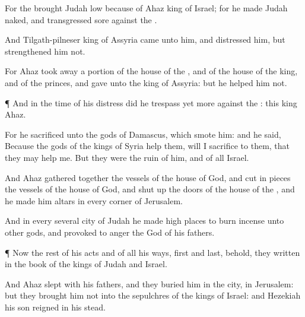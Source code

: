 {For the
{}
brought
Judah
low because of
Ahaz
king of
Israel; for he
made
Judah
naked, and
transgressed
sore against the
{}.

And
Tilgath-pilneser
king of
Assyria
came unto him, and
distressed him, but
strengthened him not.

For
Ahaz took away a
portion
{} of the
house of the
{}, and
{} of the
house of the
king, and of the
princes, and
gave
{} unto the
king of
Assyria: but he
helped him not.


\par }{\PP {}¶ And in the
time of his
distress did he
trespass yet
more against the
{}: this
{}
king
Ahaz.

For he
sacrificed unto the
gods of
Damascus, which
smote him: and he
said, Because the
gods of the
kings of
Syria
help them,
{} will I
sacrifice to them, that they may
help me. But they were the
ruin of him, and of all
Israel.

And
Ahaz gathered
together the
vessels of the
house of
God, and cut in
pieces the
vessels of the
house of
God, and shut
up the
doors of the
house of the
{}, and he
made him
altars in every
corner of
Jerusalem.

And in every several
city of
Judah he
made high
places to burn
incense unto
other
gods, and provoked to
anger the
{}
God of his
fathers.


\par }{\PP {}¶ Now the
rest of his
acts and of all his
ways,
first and
last, behold, they
{}
written in the
book of the
kings of
Judah and
Israel.

And
Ahaz
slept with his
fathers, and they
buried him in the
city,
{} in
Jerusalem: but they
brought him not into the
sepulchres of the
kings of
Israel: and
Hezekiah his
son
reigned in his stead.




\par }
